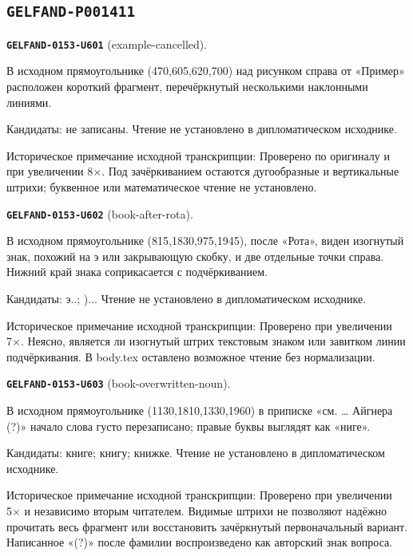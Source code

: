 \subsection*{\texttt{GELFAND-P001411}}
\par\noindent\leavevmode{}\label{GELFAND-0153-U601}\textbf{\texttt{GELFAND-0153-U601}} (example-cancelled).\nopagebreak[4]\par
В исходном прямоугольнике (470,605,620,700) над рисунком справа от «Пример» расположен короткий фрагмент, перечёркнутый несколькими наклонными линиями.\par
Кандидаты: не записаны. Чтение не установлено в дипломатическом исходнике.\par
Историческое примечание исходной транскрипции: Проверено по оригиналу и при увеличении 8×. Под зачёркиванием остаются дугообразные и вертикальные штрихи; буквенное или математическое чтение не установлено.\par\medskip
\par\noindent\leavevmode{}\label{GELFAND-0153-U602}\textbf{\texttt{GELFAND-0153-U602}} (book-after-rota).\nopagebreak[4]\par
В исходном прямоугольнике (815,1830,975,1945), после «Рота», виден изогнутый знак, похожий на э или закрывающую скобку, и две отдельные точки справа. Нижний край знака соприкасается с подчёркиванием.\par
Кандидаты: э..; )... Чтение не установлено в дипломатическом исходнике.\par
Историческое примечание исходной транскрипции: Проверено при увеличении 7×. Неясно, является ли изогнутый штрих текстовым знаком или завитком линии подчёркивания. В body.tex оставлено возможное чтение без нормализации.\par\medskip
\par\noindent\leavevmode{}\label{GELFAND-0153-U603}\textbf{\texttt{GELFAND-0153-U603}} (book-overwritten-noun).\nopagebreak[4]\par
В исходном прямоугольнике (1130,1810,1330,1960) в приписке «см. … Айгнера (?)» начало слова густо перезаписано; правые буквы выглядят как «ниге».\par
Кандидаты: книге; книгу; книжке. Чтение не установлено в дипломатическом исходнике.\par
Историческое примечание исходной транскрипции: Проверено при увеличении 5× и независимо вторым читателем. Видимые штрихи не позволяют надёжно прочитать весь фрагмент или восстановить зачёркнутый первоначальный вариант. Написанное «(?)» после фамилии воспроизведено как авторский знак вопроса.\par\medskip
